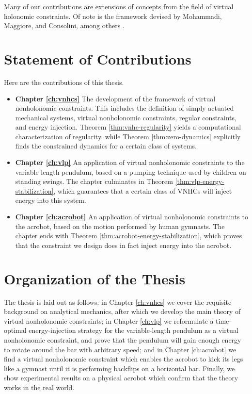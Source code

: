 Many of our contributions are extensions of concepts from the field of virtual
holonomic constraints. 
Of note is the framework devised by Mohammadi, Maggiore, and
Consolini, among others
\cite{vhcs_for_el_systems,dynamic_vhcs_stabilize_closed_orbits,lagrangian_structure_reduced_dynamics_vhcs,xingbo_thesis}.

\section{Statement of Contributions}
Here are the contributions of this thesis.
\begin{itemize}[label={}]
   \item \textbf{Chapter \ref{ch:vnhcs}} The development of the framework of
      virtual nonholonomic constraints.
      This includes the definition of simply actuated mechanical systems, virtual
      nonholonomic constraints, regular constraints, and energy injection.
      Theorem \ref{thm:vnhc-regularity} yields a computational characterization
      of regularity, while Theorem \ref{thm:zero-dynamics} explicitly finds the
      constrained dynamics for a certain class of systems.
   \item \textbf{Chapter \ref{ch:vlp}} An application of virtual nonholonomic
      constraints to the variable-length pendulum, based on a pumping technique
      used by children on standing swings.
      The chapter culminates in Theorem \ref{thm:vlp-energy-stabilization},
      which guarantees that a certain class of VNHCs will inject energy into
      this system.
   \item \textbf{Chapter \ref{ch:acrobot}} An application of virtual
      nonholonomic constraints to the acrobot, based on the motion performed by
      human gymnasts.
      The chapter ends with Theorem \ref{thm:acrobot-energy-stabilization},
      which proves that the constraint we design does in fact inject energy into
      the acrobot.
\end{itemize}

\section{Organization of the Thesis}
The thesis is laid out as follows: 
in Chapter \ref{ch:vnhcs} we cover the requisite background on analytical 
mechanics, after which we develop the main theory of virtual nonholonomic
constraints;
in Chapter \ref{ch:vlp} we reformulate a time-optimal energy-injection strategy
for the variable-length pendulum as a virtual nonholonomic constraint, and
prove that the pendulum will gain enough energy to rotate around the bar with
arbitrary speed;
and in Chapter \ref{ch:acrobot} we find a virtual nonholonomic constraint 
which enables the acrobot to kick its legs like a gymnast until it is
performing backflips on a horizontal bar.
Finally, we show experimental results on a physical acrobot which confirm
that the theory works in the real world.

